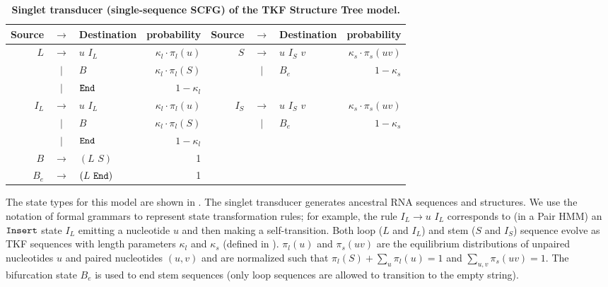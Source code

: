 \documentclass[10pt]{article}
\begin{document}
\begin{table}[!ht]
  \caption{
    \textbf{Singlet transducer (single-sequence SCFG) of the TKF Structure Tree model.}}
  \begin{tabular}{|rcl|r||rcl|r|}
    \hline
    Source & $\rightarrow$ & Destination & probability & Source & $\rightarrow$ & Destination & probability \\ \hline
    $L$ & $\rightarrow$ & $u \,\, I_L$ & $\kappa_l \cdot \pi_l(u)$ & $S$ & $\rightarrow$ & $u \,\, I_S \,\, v$ & $\kappa_s \cdot \pi_s(uv)$ \\ \hline
    & $|$ & $B$ & $\kappa_l \cdot \pi_l(S)$ & & $|$ & $B_e$ & $1-\kappa_s$ \\ \hline
    & $|$ & $\mathtt{End}$ & $1-\kappa_l$ & & & & \\ \hline
    $I_L$ & $\rightarrow$ & $u \, \, I_L$ & $\kappa_l \cdot \pi_l(u)$ & $I_S$ & $\rightarrow$ & $u \,\, I_S \,\, v$ & $\kappa_s \cdot \pi_s(uv)$\\ \hline
    & $|$ & $B$ & $\kappa_l \cdot \pi_l(S)$ & & $|$ & $B_e$ & $1-\kappa_s$\\ \hline
    & $|$ & $\mathtt{End}$ & $1-\kappa_l$ & & & & \\ \hline \hline
    $B$ & $\rightarrow$ & $(L \,\, S)$ & 1 & & & & \\ \hline
    $B_e$ & $\rightarrow$ & $(L \,\, \mathtt{End})$ & 1 & & & & \\ \hline
  \end{tabular}
  \begin{flushleft}
    The state types for this model are shown in
    .  The singlet transducer generates
    ancestral RNA sequences and structures.  We use the notation of
    formal grammars to represent state transformation rules; for
    example, the rule $I_L \rightarrow u\,\,I_L$ corresponds to (in a
    Pair HMM) an $\mathtt{Insert}$ state $I_L$ emitting a nucleotide $u$ and
    then making a self-transition.  Both loop ($L$ and $I_L$) and stem
    ($S$ and $I_S$) sequence evolve as TKF sequences with length
    parameters $\kappa_l$ and $\kappa_s$ (defined in ).  $\pi_l(u)$ and $\pi_s(uv)$ are
    the equilibrium distributions of unpaired nucleotides $u$ and
    paired nucleotides $(u,v)$ and are normalized such that
    $\pi_l(S) + \sum_u \pi_l(u) = 1$ and $\sum_{u,v} \pi_s(uv) = 1$.  The bifurcation state $B_e$ is used
    to end stem sequences (only loop sequences are allowed to
    transition to the empty string).
  \end{flushleft}
\end{table}
\end{document}
